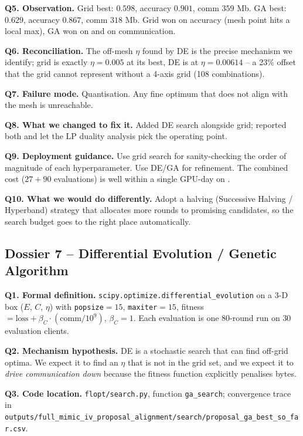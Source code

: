 \textbf{Q5. Observation.}
Grid best: \auprc{} $0.598$, accuracy $0.901$, comm $359$ Mb. GA best:
\auprc{} $0.629$, accuracy $0.867$, comm $318$ Mb. Grid won on
accuracy (mesh point hits a local max), GA won on \auprc{} and on
communication.

\textbf{Q6. Reconciliation.}
The off-mesh $\eta$ found by DE is the precise mechanism we identify;
grid is exactly $\eta\!=\!0.005$ at its best, DE is at
$\eta\!=\!0.00614$ -- a 23\% offset that the grid cannot represent
without a 4-axis grid (108 combinations).

\textbf{Q7. Failure mode.}
Quantisation. Any fine optimum that does not align with the mesh is
unreachable.

\textbf{Q8. What we changed to fix it.}
Added DE search alongside grid; reported both and let the LP duality
analysis pick the operating point.

\textbf{Q9. Deployment guidance.}
Use grid search for sanity-checking the order of magnitude of each
hyperparameter. Use DE/GA for refinement. The combined cost
($27 + 90$ evaluations) is well within a single GPU-day on \mimic{}.

\textbf{Q10. What we would do differently.}
Adopt a halving (Successive Halving / Hyperband) strategy that
allocates more rounds to promising candidates, so the search budget
goes to the right place automatically.

\subsection{Dossier 7 -- Differential Evolution / Genetic Algorithm}
\label{sec:dossier-de}

\textbf{Q1. Formal definition.}
\texttt{scipy.optimize.differential\_evolution} on a $3$-D box
($E$, $C$, $\eta$) with \texttt{popsize}$=15$, \texttt{maxiter}$=15$,
fitness $= \text{loss} + \beta_C \cdot (\text{comm}/10^9)$,
$\beta_C \!=\! 1$. Each evaluation is one $80$-round
\fedavg{} run on $30$ evaluation clients.

\textbf{Q2. Mechanism hypothesis.}
DE is a stochastic search that can find off-grid optima. We expect it
to find an $\eta$ that is not in the grid set, and we expect it to
\emph{drive communication down} because the fitness function
explicitly penalises bytes.

\textbf{Q3. Code location.} \texttt{flopt/search.py}, function
\texttt{ga\_search}; convergence trace in
\texttt{outputs/full\_mimic\_iv\_proposal\_alignment/search/proposal\_ga\_best\_so\_far.csv}.


